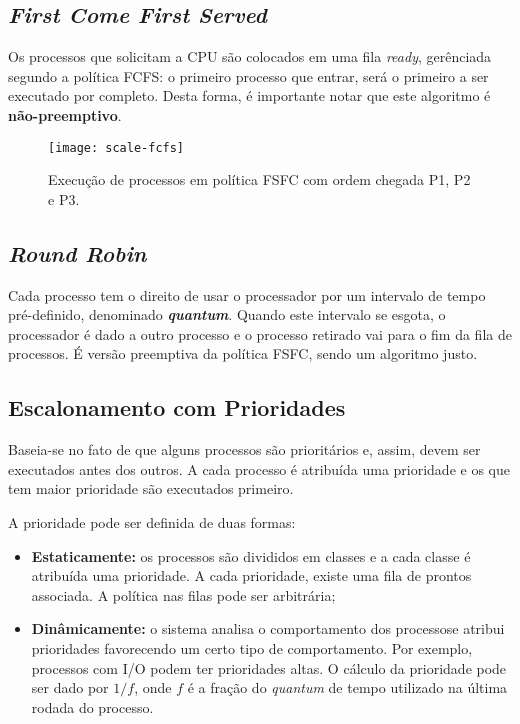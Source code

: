 \subsection{\textit{First Come First Served}}
Os processos que solicitam a CPU são colocados em uma fila \textit{ready}, gerênciada segundo a política FCFS: o primeiro processo que entrar, será o primeiro a ser executado por completo. Desta forma, é importante notar que este algoritmo é \textbf{não-preemptivo}.

\begin{figure}
  \centering
  \texttt{[image: scale-fcfs]}
  \caption{Execução de processos em política FSFC com ordem chegada P1, P2 e P3.}
  \label{fig:scale-fcfs}
\end{figure}





\subsection{\textit{Round Robin}}
Cada processo tem o direito de usar o processador por um intervalo de tempo pré-definido, denominado \textbf{\textit{quantum}}. Quando este intervalo se esgota, o processador é dado a outro processo e o processo retirado vai para o fim da fila de processos. É versão preemptiva da política FSFC, sendo um algoritmo justo.





\subsection{Escalonamento com Prioridades}
Baseia-se no fato de que alguns processos são prioritários e, assim, devem ser executados antes dos outros. A cada processo é atribuída uma prioridade e os que tem maior prioridade são executados primeiro.

A prioridade pode ser definida de duas formas:
\begin{itemize}
  \item \textbf{Estaticamente:} os processos são divididos em classes e a cada classe é atribuída uma prioridade. A cada prioridade, existe uma fila de prontos associada. A política nas filas pode ser arbitrária;

  \item \textbf{Dinâmicamente:} o sistema analisa o comportamento dos processose atribui prioridades favorecendo um certo tipo de comportamento. Por exemplo, processos com I/O podem ter prioridades altas. O cálculo da prioridade pode ser dado por $1/f$, onde $f$ é a fração do \textit{quantum} de tempo utilizado na última rodada do processo.
\end{itemize}

